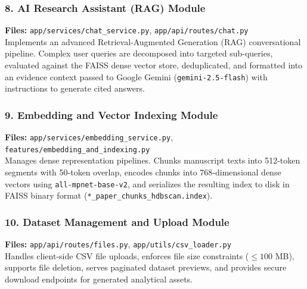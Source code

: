 \subsubsection{8. AI Research Assistant (RAG) Module}
\textbf{Files:} \texttt{app/services/chat\_service.py}, \texttt{app/api/routes/chat.py}\\
Implements an advanced Retrieval-Augmented Generation (RAG) conversational pipeline. Complex user queries are decomposed into targeted sub-queries, evaluated against the FAISS dense vector store, deduplicated, and formatted into an evidence context passed to Google Gemini (\texttt{gemini-2.5-flash}) with instructions to generate cited answers.

\subsubsection{9. Embedding and Vector Indexing Module}
\textbf{Files:} \texttt{app/services/embedding\_service.py}, \texttt{features/embedding\_and\_indexing.py}\\
Manages dense representation pipelines. Chunks manuscript texts into 512-token segments with 50-token overlap, encodes chunks into 768-dimensional dense vectors using \texttt{all-mpnet-base-v2}, and serializes the resulting index to disk in FAISS binary format (\texttt{*\_paper\_chunks\_hdbscan.index}).

\subsubsection{10. Dataset Management and Upload Module}
\textbf{Files:} \texttt{app/api/routes/files.py}, \texttt{app/utils/csv\_loader.py}\\
Handles client-side CSV file uploads, enforces file size constraints ($\le 100$ MB), supports file deletion, serves paginated dataset previews, and provides secure download endpoints for generated analytical assets.
